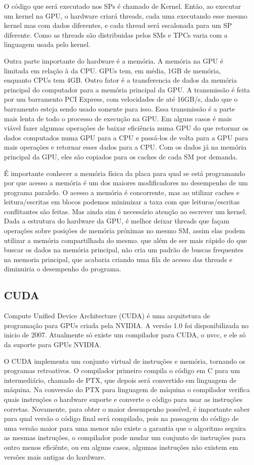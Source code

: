 O código que será executado nos SPs é chamado de Kernel. Então, ao executar um kernel na GPU, o hardware criará threads,
cada uma executando esse mesmo kernel mas com dados diferentes, e cada thread será escalonada para um SP diferente. Como
as threads são distribuidas pelos SMs e TPCs varia com a linguagem usada pelo kernel.

Outra parte importante do hardware é a memória. A memória na GPU é limitada em relação à da CPU. GPUs tem, em média, 1GB
de memória, enquanto CPUs tem 4GB. Outro fator é a transferencia de dados da memória principal do computador para a memória 
principal da GPU. A transmissão é feita por um barramento PCI Express, com velocidades de até 16GB/s, dado que o
barramento esteja sendo usado somente para isso. Essa transmissão é a parte mais lenta de todo o
processo de execução na GPU. Em alguns casos é mais viável fazer algumas operações de baixar eficiência numa GPU do que
retornar os dados computados numa GPU para a CPU e passá-los de volta para a GPU para mais operações e retornar esses
dados para a CPU. Com os dados já na memória principal da GPU, eles são copiados para os caches de cada SM por demanda.

É importante conhecer a memória física da placa para qual se está programando por que acesso a memória é um dos maiores
modificadores no desempenho de um programa paralelo. O acesso a memória é concorrente, mas ao utilizar caches e leitura/escritas em
blocos podemos minimizar a taxa com que leituras/escritas conflitantes são feitas. Mas ainda sim é necessário atenção ao escrever um
kernel. Dada a estrutura do hardware da GPU, é melhor deixar threads que façam operações sobre posições de memória próximas no mesmo
SM, assim elas podem utilizar a memória compartilhada do mesmo. que além de ser mais rápido do que buscar os dados na memória principal,
não cria um padrão de buscas frequentes na memoria principal, que acabaria criando uma fila de acesso das threads e diminuiria o desempenho
do programa.
\subsection{CUDA}
Compute Unified Device Architecture (CUDA) é uma arquitetura de programação para GPUs criada pela NVIDIA.
A versão 1.0 foi disponibilizada no inicio de 2007. Atualmente só existe um compilador para CUDA, o nvcc,
e ele só da suporte para GPUs NVIDIA.

O CUDA implementa um conjunto virtual de instruções e memória, tornando os programas retroativos. O compilador
primeiro compila o código em C para um intermediário, chamado de PTX, que depois será convertido em linguagem
de máquina. Na conversão do PTX para linguagem de máquina o compilador verifica quais instruções o hardware
suporte e converte o código para usar as instruções corretas. Novamente, para obter o maior desempenho possível,
é importante saber para qual versão o código final será compilado, pois na passagem do código de uma versão
maior para uma menor não existe a garantia que o algoritmo seguira as mesmas instruções, o compilador pode
mudar um conjunto de instruções para outro menos eficiênte, ou em alguns casos, algumas instruções não existem em
versões mais antigas do hardware.

